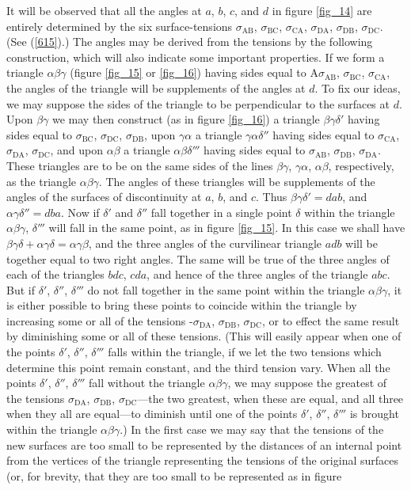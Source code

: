 \documentclass[12pt]{article}
\newcommand{\dd}{\delta}
\begin{document}
It will be observed that all the angles at $a$, $b$, $c$, and $d$ in figure \ref{fig_14} are entirely determined by the six surface-tensions $\sigma_{\text{AB}}$, $\sigma_{\text{BC}}$, $\sigma_{\text{CA}}$, $\sigma_{\text{DA}}$, $\sigma_{\text{DB}}$, $\sigma_{\text{DC}}$. (See (\ref{615}).) The angles may be derived from the tensions by the following construction, which will also indicate some important properties. If we form a triangle $\alpha\beta\gamma$ (figure \ref{fig_15} or \ref{fig_16}) having sides equal to A$\sigma_{\text{AB}}$, $\sigma_{\text{BC}}$, $\sigma_{\text{CA}}$, the angles of the triangle will be supplements of the angles at $d$. To fix our ideas, we may suppose the sides of the triangle to be perpendicular to the surfaces at $d$. Upon $\beta\gamma$ we may then construct (as in figure \ref{fig_16}) a triangle $\beta\gamma\dd'$ having sides equal to $\sigma_{\text{BC}}$, $\sigma_{\text{DC}}$, $\sigma_{\text{DB}}$, upon $\gamma\alpha$ a triangle $\gamma\alpha\dd''$ having sides equal to $\sigma_{\text{CA}}$, $\sigma_{\text{DA}}$, $\sigma_{\text{DC}}$, and upon $\alpha\beta$ a triangle $\alpha\beta\dd'''$ having sides equal to $\sigma_{\text{AB}}$, $\sigma_{\text{DB}}$, $\sigma_{\text{DA}}$. These triangles are to be on the same sides of the lines $\beta\gamma$, $\gamma\alpha$, $\alpha\beta$, respectively, as the triangle $\alpha\beta\gamma$. The angles of these triangles will be supplements of the angles of the surfaces of discontinuity at $a$, $b$, and $c$. Thus $\beta \gamma\dd'=dab$, and $\alpha \gamma\dd''=dba$. Now if $\dd'$ and $\dd''$ fall together in a single point $\dd$ within the triangle $\alpha \beta\gamma$, $\dd'''$ will fall in the same point, as in figure \ref{fig_15}. In this case we shall have $\beta \gamma \dd + \alpha \gamma \dd =\alpha \gamma \beta$, and the three angles of the curvilinear triangle $adb$ will be together equal to two right angles. The same will be true of the three angles of each of the triangles $bdc$, $cda$, and hence of the three angles of the triangle $abc$. But if $\dd'$, $\dd''$, $\dd'''$ do not fall together in the same point within the triangle $\alpha \beta \gamma$, it is either possible to bring these points to coincide within the triangle by increasing some or all of the tensions -$\sigma_{\text{DA}}$, $\sigma_{\text{DB}}$, $\sigma_{\text{DC}}$, or to effect the same result by diminishing some or all of these tensions. (This will easily appear when one of the points $\dd'$, $\dd''$, $\dd'''$ falls within the triangle, if we let the two tensions which determine this point remain constant, and the third tension vary. When all the points $\dd'$, $\dd''$, $\dd'''$ fall without the triangle $\alpha \beta \gamma$, we may suppose the greatest of the tensions $\sigma_{\text{DA}}$, $\sigma_{\text{DB}}$, $\sigma_{\text{DC}}$---the two greatest, when these are equal, and all three when they all are equal---to diminish until one of the points $\dd'$, $\dd''$, $\dd'''$ is brought within the triangle $\alpha \beta \gamma$.) In the first case we may say that the tensions of the new surfaces are too small to be represented by the distances of an internal point from the vertices of the triangle representing the tensions of the original surfaces (or, for brevity, that they are too small to be represented as in figure 
\end{document}
